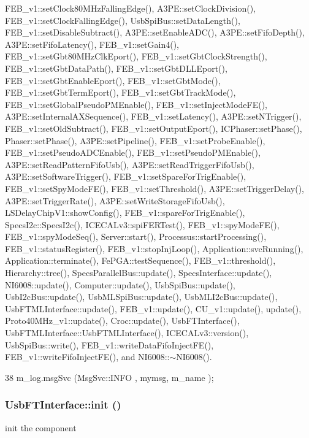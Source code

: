 FEB\_\-v1::setClock80MHzFallingEdge(), A3PE::setClockDivision(), FEB\_\-v1::setClockFallingEdge(), UsbSpiBus::setDataLength(), FEB\_\-v1::setDisableSubtract(), A3PE::setEnableADC(), A3PE::setFifoDepth(), A3PE::setFifoLatency(), FEB\_\-v1::setGain4(), FEB\_\-v1::setGbt80MHzClkEport(), FEB\_\-v1::setGbtClockStrength(), FEB\_\-v1::setGbtDataPath(), FEB\_\-v1::setGbtDLLEport(), FEB\_\-v1::setGbtEnableEport(), FEB\_\-v1::setGbtMode(), FEB\_\-v1::setGbtTermEport(), FEB\_\-v1::setGbtTrackMode(), FEB\_\-v1::setGlobalPseudoPMEnable(), FEB\_\-v1::setInjectModeFE(), A3PE::setInternalAXSequence(), FEB\_\-v1::setLatency(), A3PE::setNTrigger(), FEB\_\-v1::setOldSubtract(), FEB\_\-v1::setOutputEport(), ICPhaser::setPhase(), Phaser::setPhase(), A3PE::setPipeline(), FEB\_\-v1::setProbeEnable(), FEB\_\-v1::setPseudoADCEnable(), FEB\_\-v1::setPseudoPMEnable(), A3PE::setReadPatternFifoUsb(), A3PE::setReadTriggerFifoUsb(), A3PE::setSoftwareTrigger(), FEB\_\-v1::setSpareForTrigEnable(), FEB\_\-v1::setSpyModeFE(), FEB\_\-v1::setThreshold(), A3PE::setTriggerDelay(), A3PE::setTriggerRate(), A3PE::setWriteStorageFifoUsb(), LSDelayChipV1::showConfig(), FEB\_\-v1::spareForTrigEnable(), SpecsI2c::SpecsI2c(), ICECALv3::spiFERTest(), FEB\_\-v1::spyModeFE(), FEB\_\-v1::spyModeSeq(), Server::start(), Processus::startProcessing(), FEB\_\-v1::statusRegister(), FEB\_\-v1::stopInjLoop(), Application::svcRunning(), Application::terminate(), FePGA::testSequence(), FEB\_\-v1::threshold(), Hierarchy::tree(), SpecsParallelBus::update(), SpecsInterface::update(), NI6008::update(), Computer::update(), UsbSpiBus::update(), UsbI2cBus::update(), UsbMLSpiBus::update(), UsbMLI2cBus::update(), UsbFTMLInterface::update(), FEB\_\-v1::update(), CU\_\-v1::update(), update(), Proto40MHz\_\-v1::update(), Croc::update(), UsbFTInterface(), UsbFTMLInterface::UsbFTMLInterface(), ICECALv3::version(), UsbSpiBus::write(), FEB\_\-v1::writeDataFifoInjectFE(), FEB\_\-v1::writeFifoInjectFE(), and NI6008::$\sim$NI6008().


\begin{DoxyCode}
38 { m_log.msgSvc (MsgSvc::INFO    , mymsg, m_name ); }
\end{DoxyCode}
\hypertarget{classUsbFTInterface_a5371fe7b447850599eaec81a0ffa2ba0}{
\subsubsection[{init}]{ UsbFTInterface::init ()}}
\label{classUsbFTInterface_a5371fe7b447850599eaec81a0ffa2ba0}
init the component

